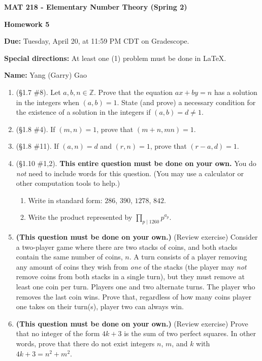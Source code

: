 \documentclass[11pt,a4paper]{article}
\newcommand{\Z}{\mathbb{Z}}
\begin{document}
\begin{Large}
\centerline{\bf MAT 218 - Elementary Number Theory (Spring 2)}\medskip
\centerline{\bf Homework 5}\medskip
\end{Large}
{\bf Due:} Tuesday, April 20, at 11:59 PM CDT on Gradescope.

{\bf Special directions:} At least one (1) problem must be done in \LaTeX.

{\bf Name:} Yang (Garry) Gao


\hrulefill

\begin{enumerate}

	\item (\S 1.7 \#8). Let \(a, b, n \in \Z\). Prove that the equation \(ax+by = n\) has a solution in the integers when \((a,b) = 1\). State (and prove) a necessary condition for the existence of a solution in the integers if \((a,b)= d \ne 1\).

	\item (\S 1.8 \#4). If \((m,n)=1\), prove that \((m+n,mn)=1\).

	\item (\S 1.8 \#11).  If \((a,n)=d\) and \((r,n)=1\), prove that \((r-a,d)=1\).

	\item (\S 1.10 \#1,2). \textbf{This entire question must be done on your own.} You do \textit{not} need to include words for this question. (You may use a calculator or other computation tools to help.)
	\begin{enumerate}
		\item  Write in standard form: \(286\), \(390\), \(1278\), \(842\).
		\item  Write the product represented by \( \prod\limits_{p \mid 1260} p^{a_{p}} \).
	\end{enumerate}

	\item \textbf{(This question must be done on your own.)} (Review exercise) Consider a two-player game where there are two stacks of coins, and both stacks contain the same number of coins, \(n\). A turn consists of a player removing any amount of coins they wish from \textit{one} of the stacks (the player may \textit{not} remove coins from both stacks in a single turn), but they must remove at least one coin per turn. Players one and two alternate turns. The player who removes the last coin wins. Prove that, regardless of how many coins player one takes on their turn(s), player two can always win.

	\item \textbf{(This question must be done on your own.)} (Review exercise) Prove that no integer of the form \(4k+3\) is the sum of two perfect squares. In other words, prove that there do not exist integers \(n\), \(m\), and \(k\) with \(4k+3=n^{2}+m^{2}\).

\end{enumerate}
\end{document}
